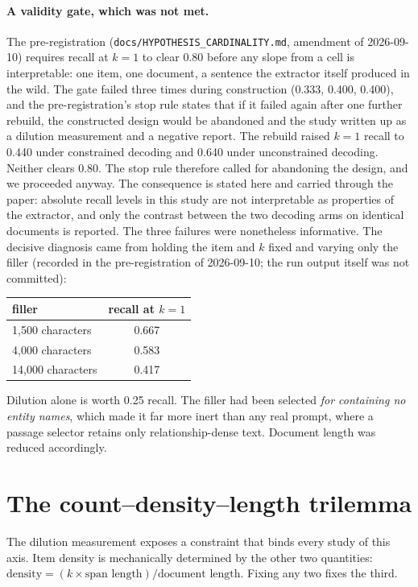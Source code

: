 \documentclass[11pt]{article}
\newcommand{\code}[1]{\texttt{\small #1}}
\begin{document}
\paragraph{A validity gate, which was not met.} The pre-registration
(\code{docs/HYPOTHESIS\_CARDINALITY.md}, amendment of 2026-09-10) requires recall
at $k = 1$ to clear 0.80 before any slope from a cell is interpretable: one item,
one document, a sentence the extractor itself produced in the wild. The gate
failed three times during construction (0.333, 0.400, 0.400), and the
pre-registration's stop rule states that if it failed again after one further
rebuild, the constructed design would be abandoned and the study written up as a
dilution measurement and a negative report. The rebuild raised $k = 1$ recall to
0.440 under constrained decoding and 0.640 under unconstrained decoding. Neither
clears 0.80. The stop rule therefore called for abandoning the design, and we
proceeded anyway. The consequence is stated here and carried through the paper:
absolute recall levels in this study are not interpretable as properties of the
extractor, and only the contrast between the two decoding arms on identical
documents is reported. The three failures were nonetheless informative. The
decisive diagnosis came from holding the item and $k$ fixed and varying only
the filler (recorded in the pre-registration of 2026-09-10; the run output itself
was not committed):

\begin{center}
\small
\begin{tabular}{lc}
\toprule
filler & recall at $k=1$ \\
\midrule
1{,}500 characters & 0.667 \\
4{,}000 characters & 0.583 \\
14{,}000 characters & 0.417 \\
\bottomrule
\end{tabular}
\end{center}

Dilution alone is worth 0.25 recall. The filler had been selected \emph{for
containing no entity names}, which made it far more inert than any real prompt,
where a passage selector retains only relationship-dense text. Document length
was reduced accordingly.

\section{The count--density--length trilemma}

The dilution measurement exposes a constraint that binds every study of this
axis. Item density is mechanically determined by the other two quantities:
$\text{density} = (k \times \text{span length}) / \text{document length}$. Fixing
any two fixes the third.
\end{document}
